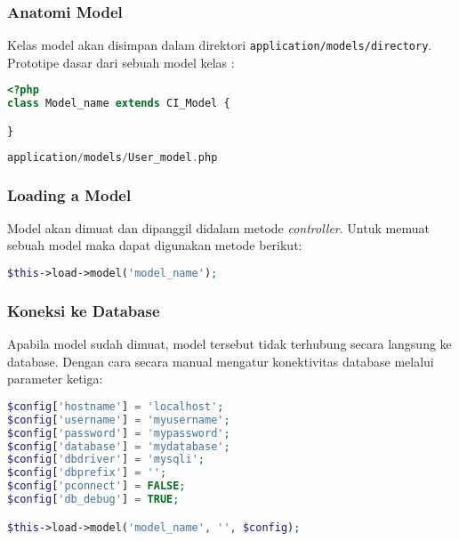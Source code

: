 \subsubsection{Anatomi Model}
Kelas model akan disimpan dalam direktori \texttt{application/models/directory}. Prototipe dasar dari sebuah model kelas :

\begin{lstlisting}[frame=single, language=PHP, label={lst:modelCI}, caption=Struktur model pada codeIgniter.]  
<?php
class Model_name extends CI_Model {

}
\end{lstlisting}

\begin{lstlisting}[frame=single, language=PHP, label={lst:userCI}, caption=Contoh model codeIgniter.]  
application/models/User_model.php
\end{lstlisting}

\subsubsection{Loading a Model}

Model akan dimuat dan dipanggil didalam metode \textit{controller}. Untuk memuat sebuah model maka dapat digunakan metode berikut:

\begin{lstlisting}[frame=single, language=PHP, label={lst:loadCI}, caption=Contoh pemanggilan model pada codeIgniter.] 
$this->load->model('model_name');
\end{lstlisting}

\subsubsection{Koneksi ke Database}
Apabila model sudah dimuat, model tersebut tidak terhubung secara langsung ke database. Dengan cara secara manual mengatur konektivitas database melalui parameter ketiga:

\begin{lstlisting}[frame=single, language=PHP, label={lst:databaseCI}, caption=Struktur database pada CodeIgniter.]
$config['hostname'] = 'localhost';
$config['username'] = 'myusername';
$config['password'] = 'mypassword';
$config['database'] = 'mydatabase';
$config['dbdriver'] = 'mysqli';
$config['dbprefix'] = '';
$config['pconnect'] = FALSE;
$config['db_debug'] = TRUE;

$this->load->model('model_name', '', $config);
\end{lstlisting}

